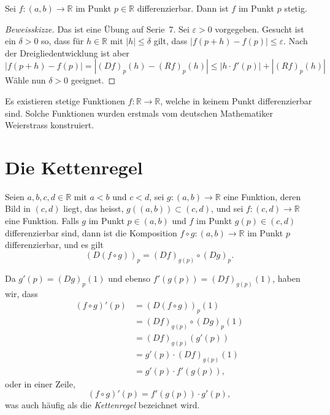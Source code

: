 \documentclass[../main.tex]{subfiles}
\begin{document}
\begin{lemma*}
  Sei $f \colon (a, b) \to \mathbb{R}$ im Punkt $p \in \mathbb{R}$ 
  differenzierbar. Dann ist $f$ im Punkt $p$ stetig.
\end{lemma*}

\begin{proof}[Beweisskizze]
  Das ist eine Übung auf Serie~7.
  Sei $\varepsilon > 0$ vorgegeben. Gesucht
  ist ein $\delta > 0$ so, dass für $h \in \mathbb{R}$ 
  mit $|h| \leq \delta$ gilt, dass
  $|f(p+h) - f(p)| \leq \varepsilon$.
  Nach der Dreigliedentwicklung ist aber
  \[
    |f(p + h) - f(p)| = |{(Df)}_p(h) - {(Rf)}_p(h)|
    \leq |h \cdot f'(p)| + |{(Rf)}_p(h)|
  \]
  Wähle nun $\delta > 0$ geeignet.
\end{proof}

\begin{remark}
  Es existieren stetige Funktionen $f \colon \mathbb{R} \to \mathbb{R}$,
  welche in keinem Punkt differenzierbar sind.
  Solche Funktionen wurden erstmals vom deutschen Mathematiker
  Weierstrass konstruiert.
\end{remark}

\section{Die Kettenregel}

\begin{chainrule}
Seien 
$a, b, c, d \in \mathbb{R}$ mit $a < b$ und $c < d$,
sei $g \colon (a, b) \to \mathbb{R}$ 
eine Funktion,
deren Bild in $(c, d)$ liegt, das heisst,
$g((a, b)) \subset (c, d)$,
und sei $f \colon (c, d) \to \mathbb{R}$ eine Funktion.
Falls $g$ im Punkt $p \in (a, b)$ und $f$ 
im Punkt $g(p) \in (c, d)$ differenzierbar sind,
dann ist die Komposition
$f \circ g \colon (a, b) \to \mathbb{R}$ 
im Punkt $p$ differenzierbar, und es gilt
\[
  {(D(f \circ g))}_p = {(Df)}_{g(p)} \circ {(Dg)}_p.
\]
\end{chainrule}

\begin{remark}
  Da $g'(p) = {(Dg)}_p(1)$ und
  ebenso $f'(g(p)) = {(Df)}_{g(p)}(1)$,
  haben wir, dass
  \begin{align*}
    (f \circ g)'(p)
    & = {(D(f \circ g))}_p(1) \\
    & = {(Df)}_{g(p)} \circ {(Dg)}_p(1) \\
    & = {(Df)}_{g(p)}(g'(p)) \\
    & = g'(p) \cdot {(Df)}_{g(p)}(1) \\
    & = g'(p) \cdot f'(g(p)),
  \end{align*}
  oder in einer Zeile,
  \[
    (f \circ g)'(p) = f'(g(p)) \cdot g'(p),
  \]
  was auch häufig als die \emph{Kettenregel}
  bezeichnet wird.
\end{remark}
\end{document}
